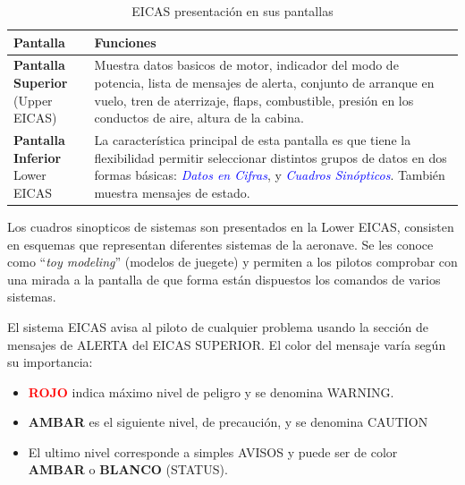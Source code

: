 \begin{table}[!h]\centering
\caption{EICAS presentaci\'on en sus pantallas}
\label{tab:01.eicas.presentacion.en.pantallas}
  
\begin{tabular}{m{0.3\textwidth}m{0.65\textwidth}} \hline {}
{\bf Pantalla} & {\bf Funciones } \\ \hline
\parbox{\linewidth}{  \textbf{Pantalla Superior} \\
(Upper EICAS)
}
& Muestra datos basicos de motor, indicador del modo de potencia, 
lista de mensajes de alerta, 
conjunto de arranque en vuelo, 
tren de aterrizaje, 
flaps,
combustible,
presi\'on en los conductos de aire,
altura de la cabina. \\ 

\parbox{\linewidth}{  \textbf{Pantalla Inferior} \\ Lower EICAS}
& 
La característica principal de esta
pantalla es que tiene la flexibilidad
permitir seleccionar distintos grupos
de datos en dos formas básicas:
\textcolor{blue}{\it Datos en Cifras}, y
\textcolor{blue}{\it Cuadros Sin\'opticos}.
Tambi\'en muestra mensajes de estado. \\ \hline
\end{tabular}
\end{table}


Los cuadros sinopticos de sistemas son presentados en la Lower EICAS, consisten en esquemas que representan diferentes sistemas de la aeronave.  Se les conoce como ``{\it toy modeling}'' (modelos de juegete) y permiten a los pilotos comprobar con una mirada a la pantalla de que forma est\'an dispuestos los comandos de varios sistemas. 

\begin{myboxAzul}{}
  El sistema EICAS avisa al piloto de cualquier problema usando la
  sección de mensajes de ALERTA del EICAS SUPERIOR.  El color del
  mensaje varía según su importancia:

  \begin{itemize}
  \item \textcolor{red}{\bf ROJO} indica máximo nivel de peligro y se
    denomina WARNING.

  \item \textcolor{amber}{\bf AMBAR} es el siguiente nivel, de
    precaución, y se denomina CAUTION

  \item El ultimo nivel corresponde a simples AVISOS y puede ser de
    color \textcolor{amber}{\bf AMBAR} o {\bf BLANCO} \mbox{(STATUS)}.
  \end{itemize}
\end{myboxAzul}

